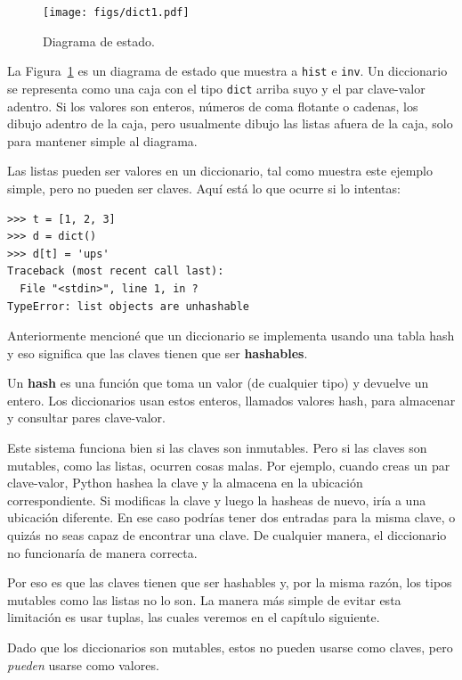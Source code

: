 \documentclass[10pt]{book}
\begin{document}
\begin{figure}
\centerline
{\texttt{[image: figs/dict1.pdf]}}
\caption{Diagrama de estado.}
\label{fig.dict1}
\end{figure}

La Figura~\ref{fig.dict1} es un diagrama de estado que muestra a {\tt hist} e {\tt inv}.
Un diccionario se representa como una caja con el tipo {\tt dict} arriba suyo
y el par clave-valor adentro.  Si los valores son enteros, números de coma flotante o
cadenas, los dibujo adentro de la caja, pero usualmente dibujo las listas
afuera de la caja, solo para mantener simple al diagrama.

Las listas pueden ser valores en un diccionario, tal como muestra este ejemplo simple, pero
no pueden ser claves.  Aquí está lo que ocurre si lo intentas:


\begin{verbatim}
>>> t = [1, 2, 3]
>>> d = dict()
>>> d[t] = 'ups'
Traceback (most recent call last):
  File "<stdin>", line 1, in ?
TypeError: list objects are unhashable
\end{verbatim}
%
Anteriormente mencioné que un diccionario se implementa usando
una tabla hash y eso significa que las claves tienen que ser {\bf hashables}.

Un {\bf hash} es una función que toma un valor (de cualquier tipo)
y devuelve un entero.  Los diccionarios usan estos enteros,
llamados valores hash, para almacenar y consultar pares clave-valor.

Este sistema funciona bien si las claves son inmutables.  Pero si las
claves son mutables, como las listas, ocurren cosas malas.  Por ejemplo,
cuando creas un par clave-valor, Python hashea la clave y
la almacena en la ubicación correspondiente.  Si modificas la
clave y luego la hasheas de nuevo, iría a una ubicación diferente.
En ese caso podrías tener dos entradas para la misma clave,
o quizás no seas capaz de encontrar una clave.  De cualquier manera, el
diccionario no funcionaría de manera correcta.

Por eso es que las claves tienen que ser hashables y, por la misma razón, los tipos mutables como
las listas no lo son.  La manera más simple de evitar esta limitación es
usar tuplas, las cuales veremos en el capítulo siguiente.

Dado que los diccionarios son mutables, estos no pueden usarse como claves,
pero {\em pueden} usarse como valores.
\end{document}
